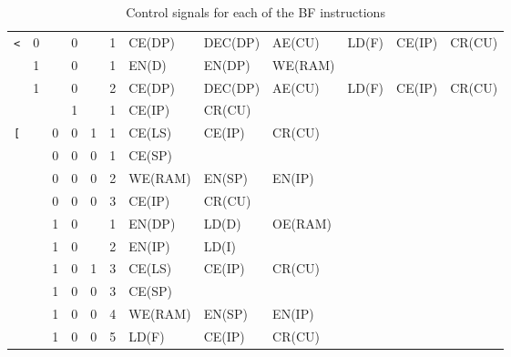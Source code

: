\begin{table}[H]
{\begin{tabular} {c|cccc|c|llllll}
      \texttt{<} & 0 &   & 0     &      & 1     & CE(DP)  & DEC(DP) & AE(CU)  & LD(F)  & CE(IP) & CR(CU) \\
      
                 & 1 &   & 0     &      & 1     & EN(D)   & EN(DP)  & WE(RAM) &        &                 \\
                 & 1 &   & 0     &      & 2     & CE(DP)  & DEC(DP) & AE(CU)  & LD(F)  & CE(IP) & CR(CU) \\
      
                 &   &   & 1     &      & 1     & CE(IP)  & CR(CU)  &         &        &                 \\ \hline

      \texttt{[} &   & 0 & 0     & 1    & 1     & CE(LS)  & CE(IP) & CR(CU)                              \\
        
                 &   & 0 & 0     & 0    & 1     & CE(SP)                                                \\
                 &   & 0 & 0     & 0    & 2     & WE(RAM) & EN(SP) & EN(IP) \\
                 &   & 0 & 0     & 0    & 3     & CE(IP)  & CR(CU) \\
        
                 &   & 1 & 0     &      & 1     & EN(DP)  & LD(D) & OE(RAM)  \\
                 &   & 1 & 0     &      & 2     & EN(IP)  & LD(I) \\
                 &   & 1 & 0     & 1    & 3     & CE(LS)  & CE(IP) & CR(CU) \\
                 &   & 1 & 0     & 0    & 3     & CE(SP) \\
                 &   & 1 & 0     & 0    & 4     & WE(RAM) & EN(SP) & EN(IP) \\
                 &   & 1 & 0     & 0    & 5     & LD(F) & CE(IP) & CR(CU) \\
      
    \end{tabular}
  }
  \caption{Control signals for each of the BF instructions}
  \label{tab:microcode}
\end{table}
